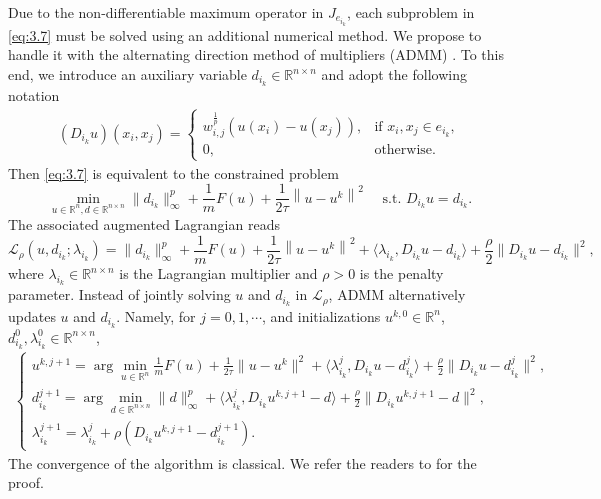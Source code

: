 \documentclass{article}
\theoremstyle{definition}
\begin{document}
Due to the non-differentiable maximum operator in $J_{e_{i_k}}$, each subproblem in \eqref{eq:3.7} must be solved using an additional numerical method.
We propose to handle it with the alternating direction method of multipliers (ADMM) \cite{boyd2011distributed}.
To this end, we introduce an auxiliary variable $d_{i_k} \in \mathbb{R}^{n \times n}$ and adopt the following notation
  \begin{align}\label{eq:Du}
    (D_{i_k}u)(x_i,x_j)=
    \begin{cases}
      w^{\frac{1}{p}}_{i,j}(u(x_i)-u(x_j)), & \mbox{if } x_i,x_j\in e_{i_k}, \\
      0, & \mbox{otherwise}.
    \end{cases}
  \end{align}
Then \eqref{eq:3.7} is equivalent to the constrained problem
\begin{equation*}%
  \min_{u\in\mathbb{R}^n,d\in\mathbb{R}^{n\times n}} \|d_{i_k}\|^p_\infty  +\frac{1}{m} F(u)+ \frac{1}{2\tau}\left\|u- u^{k}\right\|^2
   \quad \mbox{ s.t. }  D_{i_k}u=d_{i_k}.
\end{equation*}
The associated augmented Lagrangian reads
\begin{equation*}
  \mathcal{L}_\rho(u,d_{i_k};\lambda_{i_k})
  =
  \|d_{i_k}\|^p_\infty+\frac{1}{m} F(u)+ \frac{1}{2\tau}\left\|u- u^{k}\right\|^2
  +\langle \lambda_{i_k}, D_{i_k}u-d_{i_k}\rangle+\frac{\rho}{2}\|D_{i_k}u-d_{i_k}\|^2,
\end{equation*}
where $\lambda_{i_k}\in\mathbb{R}^{n\times n}$ is the Lagrangian multiplier and $\rho>0$ is the penalty parameter.
Instead of jointly solving $u$ and $d_{i_k}$ in $\mathcal{L}_\rho$, ADMM alternatively updates $u$ and $d_{i_k}$.
Namely, for $j=0,1,\cdots$, and initializations $u^{k,0}\in\mathbb{R}^n$, $d_{i_k}^{0}, \lambda_{i_k}^{0}\in\mathbb{R}^{n\times n}$,
\begin{align}\label{eq:admm}
  \begin{cases}
    u^{k,j+1}=\arg\min_{u\in\mathbb{R}^n}
  \frac{1}{m} F(u)+\frac{1}{2\tau} \|u-u^k\|^2
  +\langle \lambda_{i_k}^{j}, D_{i_k}u-d_{i_k}^{j}\rangle+\frac{\rho}{2}\|D_{i_k}u-d_{i_k}^{j}\|^2, \\
   d_{i_k}^{j+1}= \arg\min_{d\in\mathbb{R}^{n\times n}} \|d\|^p_\infty
  +\langle \lambda_{i_k}^{j}, D_{i_k}u^{k,j+1}-d\rangle+\frac{\rho}{2}\|D_{i_k}u^{k,j+1}-d\|^2, \\
   \lambda_{i_k}^{j+1}= \lambda_{i_k}^{j}+\rho(D_{i_k}u^{k,j+1}-d_{i_k}^{j+1}).
  \end{cases}
\end{align}
The convergence of the algorithm is classical.
We refer the readers to \cite{zhang2011unified} for the proof.
\end{document}

